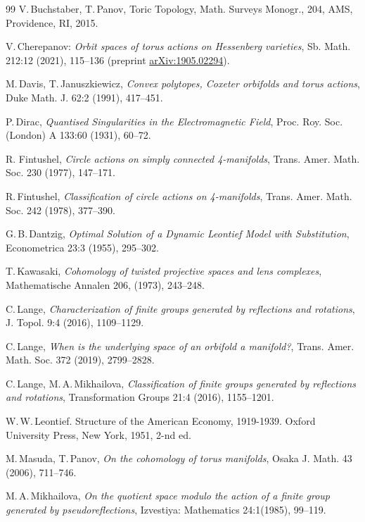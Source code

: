\documentclass[english,12pt,oneside]{amsproc}
\numberwithin{equation}{section}
\theoremstyle{plain}
\theoremstyle{definition}
\theoremstyle{remark}
\begin{document}
\begin{thebibliography}{99}
 V.\,Buchstaber, T.\,Panov, Toric Topology, Math. Surveys Monogr., 204, AMS, Providence, RI, 2015.

 V.\,Cherepanov: \textit{Orbit spaces of torus actions on Hessenberg varieties}, Sb. Math. 212:12 (2021), 115--136 (preprint \href{https://arxiv.org/abs/1905.02294}{arXiv:1905.02294}).


 M.\,Davis, T.\,Januszkiewicz, \textit{Convex polytopes, Coxeter orbifolds and torus actions}, Duke Math. J. 62:2 (1991), 417--451.

 P.\,Dirac, \textit{Quantised Singularities in the Electromagnetic Field}, Proc. Roy. Soc. (London) A 133:60 (1931), 60--72.

 R. Fintushel, \textit{Circle actions on simply connected 4-manifolds}, Trans. Amer. Math. Soc. 230 (1977), 147--171.

 R.\,Fintushel, \textit{Classification of circle actions on 4-manifolds}, Trans. Amer. Math. Soc. 242 (1978), 377--390. %

 G.\,B.\,Dantzig, \textit{Optimal Solution of a Dynamic Leontief Model with Substitution}, Econometrica 23:3 (1955),  295--302.

 T.\,Kawasaki, \textit{Cohomology of twisted projective spaces and lens complexes}, Mathematische Annalen 206, (1973), 243--248.

 C.\,Lange, \textit{Characterization of finite groups generated by reflections and rotations}, J. Topol. 9:4 (2016), 1109--1129.

 C.\,Lange, \textit{When is the underlying space of an orbifold a manifold?}, Trans. Amer. Math. Soc. 372 (2019), 2799--2828.

 C.\,Lange, M.\,A.\,Mikhailova, \textit{Classification of finite groups generated by reflections and rotations}, Transformation Groups 21:4 (2016), 1155--1201.

 W.\,W.\,Leontief. Structure of the American Economy, 1919-1939. Oxford University Press, New York,
1951, 2-nd ed.

 M.\,Masuda, T.\,Panov, \textit{On the cohomology of torus manifolds}, Osaka J. Math. 43 (2006), 711--746.

 M.\,A.\,Mikhailova, \textit{On the quotient space modulo the action of a finite group generated by pseudoreflections}, Izvestiya: Mathematics 24:1(1985), 99--119.
%


\end{thebibliography}
\end{document}
